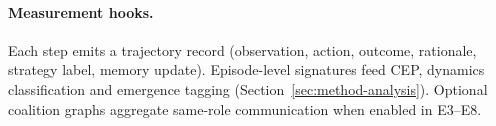 \paragraph{Measurement hooks.}
Each step emits a trajectory record (observation, action, outcome,
rationale, strategy label, memory update). Episode-level signatures feed
CEP, dynamics classification and emergence tagging
(Section~\ref{sec:method-analysis}). Optional coalition graphs aggregate
same-role communication when enabled in E3--E8.
